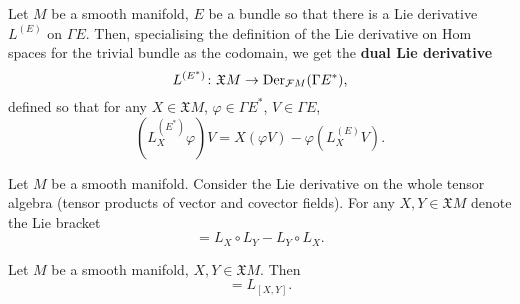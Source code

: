 \begin{definition}
  Let $M$ be a smooth manifold, $E$ be a bundle so that there is a
  Lie derivative $L^{(E)}$ on $\Gamma E$.
  Then, specialising the definition of the Lie derivative on Hom spaces for the
  trivial bundle as the codomain, we get the \textbf{dual Lie derivative}
  \begin{equation}
    L^{(E^*)} \colon \mathfrak{X} M \to {\rm Der}_{\mathcal{F} M}(\Gamma E^*),
  \end{equation}
  defined so that for any
    $X \in \mathfrak{X} M$,
    $\varphi \in \Gamma E^*$,
    $V \in \Gamma E$,
  \begin{equation}
    (L^{(E^*)}_X \varphi) V = X(\varphi V) - \varphi(L^{(E)}_X V).
  \end{equation}
\end{definition}
\begin{definition}
  Let $M$ be a smooth manifold.
  Consider the Lie derivative on the whole tensor algebra
  (tensor products of vector and covector fields).
  For any $X, Y \in \mathfrak{X} M$ denote the Lie bracket
  \begin{equation}
    [L_X , L_Y] = L_X \circ L_Y - L_Y \circ L_X.
  \end{equation}
\end{definition}
\begin{proposition}
  Let $M$ be a smooth manifold, $X, Y \in \mathfrak{X} M$.
  Then
  \begin{equation}
    [L_X , L_Y] = L_{[X, Y]}.
  \end{equation}
\end{proposition}
